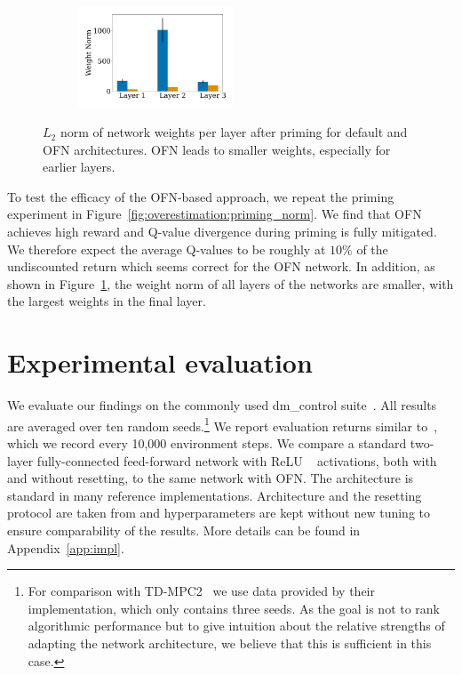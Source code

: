\begin{figure}[t]
\begin{minipage}[t]{.36\textwidth}
\begin{subfigure}[b]{\textwidth}
    \end{subfigure}
    \\%
    \begin{subfigure}[b]{\textwidth}
        \centering
        \includegraphics[width=4.6cm]{figures/dissecting/priming/weight_magnitudes.pdf}
    \end{subfigure}%
    \caption{$L_2$ norm of network weights per layer after priming for default and OFN  architectures. OFN leads to smaller weights, especially for earlier layers.}
    \label{fig:overestimation:weight_norm}
\end{minipage}
\end{figure}

To test the efficacy of the OFN-based approach, we repeat the priming experiment in Figure~\ref{fig:overestimation:priming_norm}.
We find that OFN achieves high reward and Q-value divergence during priming is fully mitigated. 
We therefore expect the average Q-values to be roughly at $10\%$ of the undiscounted return which seems correct for the OFN network. 
In addition, as shown in Figure~\ref{fig:overestimation:weight_norm}, the weight norm of all layers of the networks are smaller, with the largest weights in the final layer.

\section{Experimental evaluation}

We evaluate our findings on the commonly used \textsf{dm\_control} suite~\parencite{tunyasuvunakool2020dmcontrol}. All results are averaged over ten random seeds.\footnote{For comparison with TD-MPC2~\parencite{hansen2024tdmpc} we use data provided by their implementation, which only contains three seeds. As the goal is not to rank algorithmic performance but to give intuition about the relative strengths of adapting the network architecture, we believe that this is sufficient in this case.} We report evaluation returns similar to~\textcite{nikishin2022primacy}, which we record every 10,000 environment steps. We compare a standard two-layer fully-connected feed-forward network with ReLU ~\parencite{nair2010rectified} activations, both with and without resetting, to the same network with OFN. %
The architecture is standard in many reference implementations. Architecture and the resetting protocol are taken from \textcite{doro2023barrier} and hyperparameters are kept without new tuning to ensure comparability of the results. More details can be found in Appendix~\ref{app:impl}.

